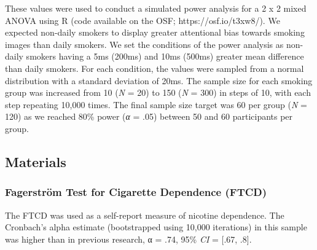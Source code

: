 \documentclass[empirical, authordate]{jote-new-article}
\begin{document}
These values were used to conduct a simulated power analysis for a 2 x 2 mixed ANOVA using R (code available on the OSF; https://osf.io/t3xw8/). We expected non-daily smokers to display greater attentional bias towards smoking images than daily smokers. We set the conditions of the power analysis as non-daily smokers having a 5ms (200ms) and 10ms (500ms) greater mean difference than daily smokers. For each condition, the values were sampled from a normal distribution with a standard deviation of 20ms. The sample size for each smoking group was increased from 10 (\emph{N} = 20) to 150 (\emph{N} = 300) in steps of 10, with each step repeating 10,000 times. The final sample size target was 60 per group (\emph{N} = 120) as we reached 80\% power (\emph{α} = .05) between 50 and 60 participants per group.

\subsection{Materials}

\subsubsection{Fagerström Test for Cigarette Dependence (FTCD)}

The FTCD \parencite{Fagerström2012, Heatherton1991} was used as a self-report measure of nicotine dependence. The Cronbach's alpha estimate (bootstrapped using 10,000 iterations) in this sample was higher than in previous research, α = .74, 95\% \emph{CI} = [.67, .8].
\end{document}
